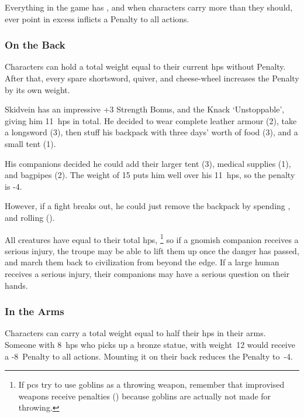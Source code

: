 \begin{multicols}{2}

\noindent%
Everything in the game has , and when characters carry more than they should, ever point in excess inflicts a Penalty to all actions.


\subsubsection{On the Back}
Characters can hold a total \gls{weight} equal to their current \glspl{hp} without Penalty.
After that, every spare shortsword, quiver, and cheese-wheel increases the Penalty by its own \gls{weight}.

\begin{exampletext}
  Skidvein has an impressive +3 Strength Bonus, and the Knack `Unstoppable', giving him 11~\glspl{hp} in total.
  He decided to wear complete leather armour (2), take a longsword (3), then stuff his backpack with three days' worth of food (3), and a small tent (1).

  His companions decided he could add their larger tent (3), medical supplies (1), and bagpipes (2).
  The \gls{weight} of 15 puts him well over his 11~\glspl{hp}, so the penalty is -4.

  However, if a fight breaks out, he could just remove the backpack by spending , and rolling  (\tn[10]).
\end{exampletext}

All creatures have  equal to their total \glspl{hp},%
\footnote{If \glspl{pc} try to use goblins as a throwing weapon, remember that improvised weapons receive penalties () because goblins are actually not made for throwing.}
so if a gnomish companion receives a serious injury, the troupe may be able to lift them up once the danger has passed, and march them back to civilization from beyond the \gls{edge}.
If a large human receives a serious injury, their companions may have a serious question on their hands.

\subsubsection{In the Arms}
Characters can carry a total \gls{weight} equal to half their \glspl{hp} in their arms.
Someone with 8~\glspl{hp} who picks up a bronze statue, with \gls{weight}~12 would receive a -8~Penalty to all actions.
Mounting it on their back reduces the Penalty to~-4.


\end{multicols}
